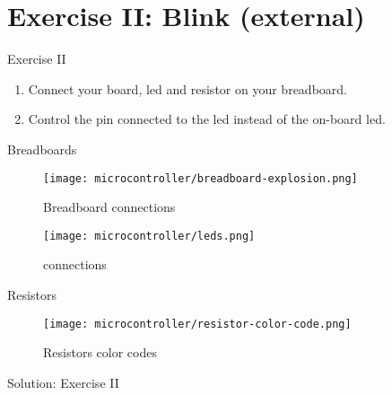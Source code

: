 \documentclass[aspectratio=169]{beamer}
\begin{document}
\section{Exercise II: Blink  (external)}

\begin{frame}
    \begin{exampleblock}{Exercise II}
        \begin{enumerate}
            \item Connect your board, \acs{led} and resistor on your breadboard.
            \item Control the pin connected to the \acs{led} instead of the on-board \acs{led}.
        \end{enumerate}
    \end{exampleblock}
\end{frame}

\begin{frame}{Breadboards}
    \begin{figure}
        \texttt{[image: microcontroller/breadboard-explosion.png]}
        \caption{Breadboard connections}
    \end{figure}
\end{frame}

\begin{frame}{}
    \begin{figure}
        \texttt{[image: microcontroller/leds.png]}
        \caption{ connections}
    \end{figure}
\end{frame}

\begin{frame}{Resistors}
    \begin{figure}
        \texttt{[image: microcontroller/resistor-color-code.png]}
        \caption{Resistors color codes}
    \end{figure}
\end{frame}

\begin{frame}{Solution: Exercise II}
    \begin{listing}[H]
        \caption{Solution for Exercise II.}
        \label{lst:arduino:exercise:2:solution}
    \end{listing}
\end{frame}
\end{document}
